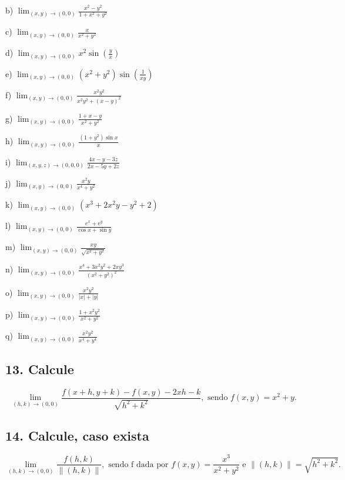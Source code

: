 \documentclass{article}
\begin{document}
        b) $\lim_{(x,y)\to(0,0)} \frac{x^2 - y^2}{1 + x^2 + y^2}$

        c) $\lim_{(x,y)\to(0,0)} \frac{x}{x^2 + y^2}$

        d) $\lim_{(x,y)\to(0,0)} x^2 \sin\left(\frac{y}{x}\right)$

        e) $\lim_{(x,y)\to(0,0)} (x^2 + y^2)\sin\left(\frac{1}{xy}\right)$

        f) $\lim_{(x,y)\to(0,0)} \frac{x^2y^2}{x^2y^2 + (x - y)^2}$

        g) $\lim_{(x,y)\to(0,0)} \frac{1 + x - y}{x^2 + y^2}$

        h) $\lim_{(x,y)\to(0,0)} \frac{(1 + y^2)\sin x}{x}$

        i) $\lim_{(x,y,z)\to(0,0,0)} \frac{4x - y - 3z}{2x - 5y + 2z}$

        j) $\lim_{(x,y)\to(0,0)} \frac{x^2y}{x^4 + y^2}$

        k) $\lim_{(x,y)\to(0,0)} (x^3 + 2x^2y - y^2 + 2)$

        l) $\lim_{(x,y)\to(0,0)} \frac{e^x + e^y}{\cos x + \sin y}$

        m) $\lim_{(x,y)\to(0,0)} \frac{xy}{\sqrt{x^2 + y^2}}$

        n) $\lim_{(x,y)\to(0,0)} \frac{x^4 + 3x^2y^2 + 2xy^3}{(x^2 + y^2)^2}$

        o) $\lim_{(x,y)\to(0,0)} \frac{x^2y^2}{|x| + |y|}$

        p) $\lim_{(x,y)\to(0,0)} \frac{1 + x^2y^2}{x^2 + y^2}$

        q) $\lim_{(x,y)\to(0,0)} \frac{x^2y^2}{x^4 + y^4}$

    \subsection*{13. Calcule}
    \[
        \lim_{(h,k) \to (0,0)} \frac{f(x + h, y + k) - f(x, y) - 2xh - k}{\sqrt{h^2 + k^2}}, \text{ sendo } f(x, y) = x^2 + y.
    \]

    \subsection*{14. Calcule, caso exista}
    \[
        \lim_{(h,k) \to (0,0)} \frac{f(h, k)}{\|(h, k)\|}, \text{ sendo f dada por } f(x, y) = \frac{x^3}{x^2 + y^2} \text{ e } \|(h, k)\| = \sqrt{h^2 + k^2}.
    \]
\end{document}
